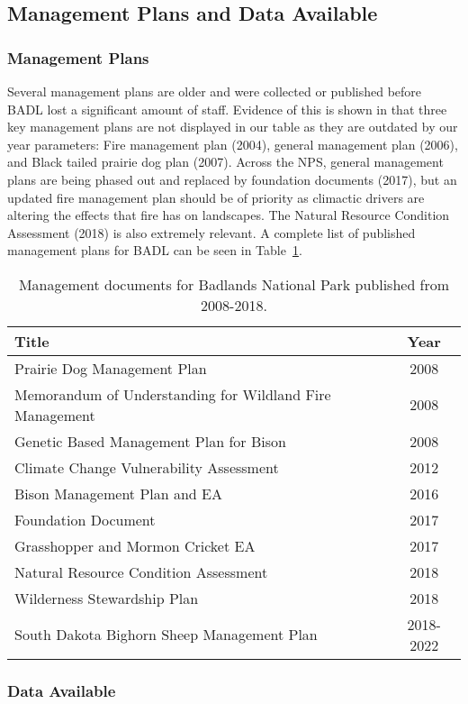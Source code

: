 \subsection{Management Plans and Data Available}

\subsubsection{Management Plans}

Several management plans are older and were collected or published before BADL lost a significant amount of staff.
Evidence of this is shown in that three key management plans are not displayed in our table as they are outdated by our year parameters: Fire management plan (2004), general management plan (2006), and Black tailed prairie dog
plan (2007). 
Across the NPS, general management plans are being phased out and replaced by foundation documents (2017), but an updated fire management plan should be of priority as climactic drivers are altering the effects that fire has on landscapes. 
The Natural Resource Condition Assessment (2018) is also extremely relevant.
A complete list of published management plans for BADL can be seen in Table~\ref{tab:BADLManDocs}.

\begin{table}[h]
	\centering
\caption[BADL management documents]
	{Management documents for Badlands National Park published from 2008-2018.} 
\label{tab:BADLManDocs}
\begin{tabular}{lc}
\toprule
Title & Year\tabularnewline
\midrule
Prairie Dog Management Plan & 2008 \tabularnewline
Memorandum of Understanding for Wildland Fire Management & 2008 \tabularnewline
Genetic Based Management Plan for Bison & 2008 \tabularnewline
Climate Change Vulnerability Assessment & 2012 \tabularnewline
Bison Management Plan and EA & 2016 \tabularnewline
Foundation Document & 2017 \tabularnewline
Grasshopper and Mormon Cricket EA  & 2017 \tabularnewline
Natural Resource Condition Assessment & 2018 \tabularnewline
Wilderness Stewardship Plan & 2018 \tabularnewline
South Dakota Bighorn Sheep Management Plan & 2018-2022 \tabularnewline
\bottomrule
\end{tabular}
\end{table}

\subsubsection{Data Available}

